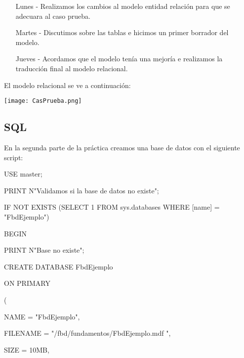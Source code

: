 \documentclass[12pt, letterpaper]{article}
\begin{document}
        \begin{itemize}
            \item[Lunes -]    Realizamos los cambios al modelo entidad relación para que se adecuara al caso prueba.
            \item[Martes -]   Discutimos sobre las tablas e hicimos un primer borrador del modelo.
            \item[Jueves -]   Acordamos que el modelo tenía una mejoría e realizamos la traducción final al modelo
                            relacional.   
        \end{itemize}

        El modelo relacional se ve a continuación:

            \texttt{[image: CasPrueba.png]}

        \subsection*{SQL}
        En la segunda parte de la práctica creamos una base de datos con el siguiente script:
        
            USE master;\vspace{.3cm}

            PRINT N"Validamos si la base de datos no existe"; \vspace{.1cm}

            IF NOT EXISTS (SELECT 1 FROM sys.databases WHERE [name] = "FbdEjemplo")\vspace{.1cm}

            BEGIN\vspace{.1cm}

            PRINT N"Base no existe"; \vspace{.3cm}

            CREATE DATABASE FbdEjemplo\vspace{.1cm}

            ON PRIMARY\vspace{.1cm}

            (\vspace{.1cm}

                NAME = "FbdEjemplo",\vspace{.1cm}

                FILENAME = "/fbd/fundamentos/FbdEjemplo.mdf ",\vspace{.1cm}

                SIZE = 10MB,\vspace{.1cm}
\end{document}
